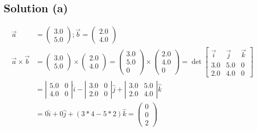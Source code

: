 \documentclass[12pt]{article}
\begin{document}
\subsection{Solution (a)}
\begin{align*}
    \vec{a} &=  \begin{pmatrix} 3.0 \\ 5.0 \end{pmatrix};
    \vec{b} =   \begin{pmatrix} 2.0 \\ 4.0 \end{pmatrix}\\
    \vec{a} \times \vec{b}  &=  \begin{pmatrix} 3.0 \\ 5.0 \end{pmatrix} \times \begin{pmatrix} 2.0 \\ 4.0 \end{pmatrix}
        =   \begin{pmatrix} 3.0 \\ 5.0 \\ 0 \end{pmatrix} \times \begin{pmatrix} 2.0 \\ 4.0 \\ 0 \end{pmatrix}
        =   \det \begin{bmatrix}
            \vec{i}     &\vec{j}    &\vec{k}\\
            3.0         &5.0        &0      \\
            2.0         &4.0        &0
        \end{bmatrix}\\
        &=  \left|\begin{matrix} 5.0 &0 \\ 4.0 &0 \end{matrix}\right| \hat{i}
            -   \left|\begin{matrix} 3.0 &0 \\ 2.0 &0 \end{matrix}\right| \hat{j}
            +   \left|\begin{matrix} 3.0 &5.0 \\ 2.0 &4.0 \end{matrix}\right| \hat{k}\\
        &=  0\hat{i} + 0\hat{j} + (3*4 - 5*2)\hat{k}
        =   \boxed{\begin{pmatrix} 0\\0\\2 \end{pmatrix}}
\end{align*}
\end{document}

